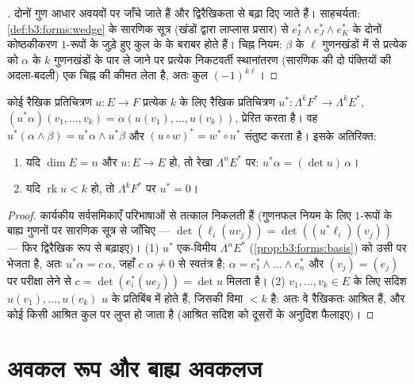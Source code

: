 \begin{proof}[\omnameProof]
दोनों गुण आधार अवयवों पर जाँचे जाते हैं और द्विरैखिकता से बढ़ा
दिए जाते हैं। साहचर्यता: \cref{def:b3:forms:wedge} के सारणिक सूत्र (खंडों द्वारा
लाप्लास प्रसार) से $e_I^* \wedge e_J^* \wedge e_K^*$ के दोनों कोष्ठकीकरण $1$-रूपों के जुड़े
हुए कुल के  के बराबर होते हैं। चिह्न नियम: $\beta$ के
$\ell$ गुणनखंडों में से प्रत्येक को $\alpha$ के $k$ गुणनखंडों के पार
ले जाने पर प्रत्येक निकटवर्ती स्थानांतरण (सारणिक की दो पंक्तियों
की अदला-बदली) एक चिह्न की कीमत लेता है, अतः कुल $(-1)^{k\ell}$।
\end{proof}

\begin{proposition}[प्रत्यानयन, रैखिक स्थिति]
\label{prop:b3:forms:linearpullback}
कोई रैखिक प्रतिचित्रण $u\colon E \to F$ प्रत्येक $k$ के लिए रैखिक प्रतिचित्रण
$u^*\colon \Lambda^kF^* \to \Lambda^kE^*$, $(u^*\alpha)(v_1, \dots, v_k) = \alpha(u(v_1), \dots,
u(v_k))$, प्रेरित करता है। वह $u^*(\alpha \wedge \beta) = u^*\alpha
\wedge u^*\beta$ और $(u \circ w)^* = w^* \circ u^*$ संतुष्ट करता है।
इसके अतिरिक्त:
\begin{enumerate}
  \item यदि $\dim E = n$ और $u\colon E \to E$ हो, तो रेखा $\Lambda^nE^*$ पर: $u^*\alpha = (\det u)\,\alpha$।
  \item यदि $\operatorname{rk}u < k$ हो, तो $\Lambda^kF^*$ पर $u^* = 0$।
\end{enumerate}
\end{proposition}

\begin{proof}
कार्यकीय सर्वसमिकाएँ परिभाषाओं से तत्काल निकलती हैं (गुणनफल नियम
के लिए $1$-रूपों के बाह्य गुणनों पर सारणिक सूत्र से जाँचिए ---
$\det(\ell_i(uv_j)) =
\det((u^*\ell_i)(v_j))$ --- फिर द्विरैखिक रूप से बढ़ाइए)।
(1) $u^*$ एक-विमीय $\Lambda^nE^*$ (\cref{prop:b3:forms:basis}) को उसी पर भेजता है, अतः $u^*\alpha =
c\,\alpha$, जहाँ
$c$ $\alpha \neq 0$ से स्वतंत्र है; $\alpha = e_1^* \wedge \dots \wedge e_n^*$ और $(v_j) =
(e_j)$ पर परीक्षा लेने से $c = \det(e_i^*(ue_j)) = \det u$
मिलता है।
(2) $v_1, \dots, v_k \in E$ के लिए सदिश $u(v_1), \dots,
u(v_k)$ $u$ के प्रतिबिंब में होते हैं, जिसकी
विमा $< k$ है: अतः वे रैखिकतः आश्रित हैं, और कोई  किसी
आश्रित कुल पर लुप्त हो जाता है (आश्रित सदिश को दूसरों के अनुदिश
फैलाइए)।
\end{proof}

\section{अवकल रूप और बाह्य अवकलज}

